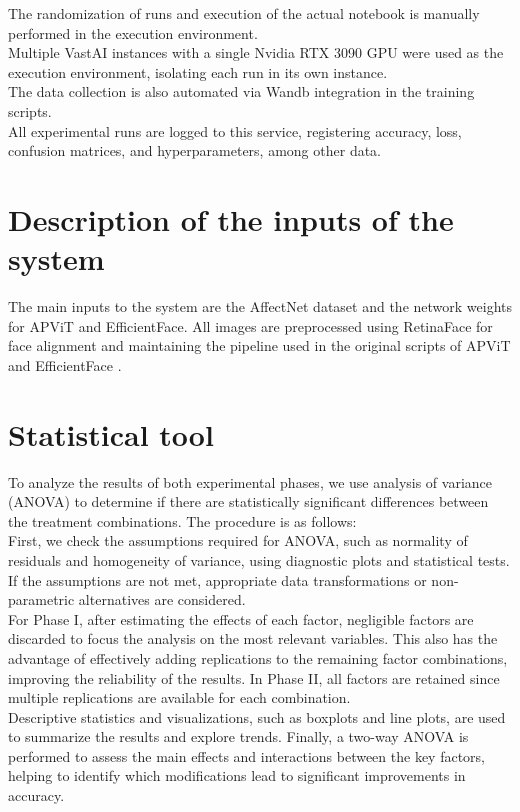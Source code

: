 The randomization of runs and execution of the actual notebook is manually performed in the execution environment.\\
Multiple VastAI instances with a single Nvidia RTX 3090 GPU were used as the execution environment, isolating each run in its own instance.\\
The data collection is also automated via Wandb integration in the training scripts.\\
All experimental runs are logged to this service, registering accuracy, loss, confusion matrices, and hyperparameters, among other data.

\section{Description of the inputs of the system}
The main inputs to the system are the AffectNet dataset and the network weights for APViT and EfficientFace. All images are preprocessed using RetinaFace \cite{retinaface2020} for face alignment and maintaining the pipeline used in the original scripts of APViT \cite{apvit2023} and EfficientFace \cite{eff-face2021}.

\section{Statistical tool}
To analyze the results of both experimental phases, we use analysis of variance (ANOVA) to determine if there are statistically significant differences between the treatment combinations. The procedure is as follows:\\

First, we check the assumptions required for ANOVA, such as normality of residuals and homogeneity of variance, using diagnostic plots and statistical tests. If the assumptions are not met, appropriate data transformations or non-parametric alternatives are considered.\\

For Phase I, after estimating the effects of each factor, negligible factors are discarded to focus the analysis on the most relevant variables. This also has the advantage of effectively adding replications to the remaining factor combinations, improving the reliability of the results. In Phase II, all factors are retained since multiple replications are available for each combination.\\

Descriptive statistics and visualizations, such as boxplots and line plots, are used to summarize the results and explore trends. Finally, a two-way ANOVA is performed to assess the main effects and interactions between the key factors, helping to identify which modifications lead to significant improvements in accuracy.

